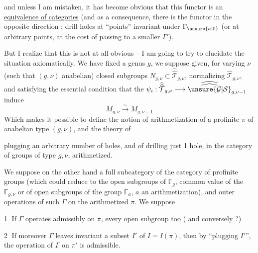 
and unless I am mistaken, it has become obvious
that this functor is an \uline{equivalence of
categories} (and as a consequence, there
is the functor in the opposite direction :
drill holes at ``points'' invariant
under $\Gamma_{\unsure{a|0}}$ (or at arbitrary points,
at the cost of passing to a smaller $\Gamma'$).

But I realize that
 this is not at all obvious -- I am going
to try to elucidate the situation axiomatically.
We have fixed a genus $g$,
we suppose given, for varying $\nu$
(such that $(g,\nu)$ anabelian) closed
subgroups $N_{g,\nu}\subset\widehat{\widehat{\mathcal T}}_{g,\nu}$,
normalizing $\widehat{\mathcal T}_{g,\nu}$, and satisfying the
essential condition that the $\psi_i:\widehat{\widehat{\mathcal T}}_{g,\nu}\longrightarrow\widehat{\widehat{\unsure{\mathcal G|\mathcal S}}}_{g,\nu-1}$
induce
\[
M_{g,\nu}\xrightarrow{\sim}M_{g,\nu-1}
\]
Which makes it possible to define the notion
of arithmetization of a profinite $\pi$ of
anabelian type $(g,\nu)$, and the theory of


plugging an arbitrary number of holes, and
of drilling just 1 hole, in the
category of groups of type $g,\nu$,
arithmetized.

We suppose on the other hand  a
full subcategory of the category of profinite
groups (which could reduce to the
open subgroups of $\mathbb{\Gamma}_g$, common
value of the $\mathbb{\Gamma}_{g,\nu}$ or of open subgroups
of the group $\mathbb{\Gamma}_a$, $a$ an
arithmetization), and  outer operations
 of such $\Gamma$ on the
arithmetized $\pi$. We suppose

\textcircled{1} If $\Gamma$ operates admissibly on $\pi$, every
open subgroup too ( and conversely ?)

\textcircled{2} If moreover $\Gamma$ leaves invariant a subset $I'$
of $I=I(\pi)$, then by ``plugging $I'$'',
the operation of $\Gamma$ on $\pi'$ is admissible.


